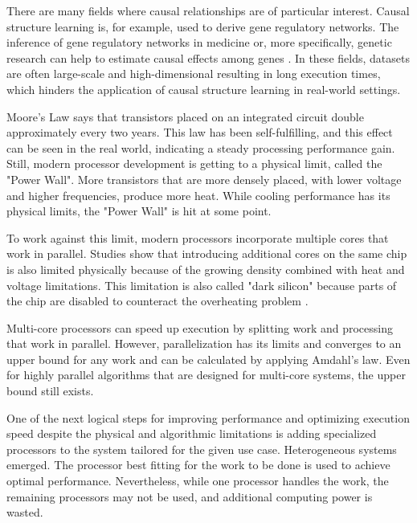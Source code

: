 There are many fields where causal relationships are of particular interest. Causal structure learning is, for example, used to derive gene regulatory networks. The inference of gene regulatory networks in medicine or, more specifically, genetic research can help to estimate causal effects among genes \cite{rauJointEstimationCausal2013}.
In these fields, datasets are often large-scale and high-dimensional resulting in long execution times, which hinders the application of causal structure learning in real-world settings.

Moore's Law \cite{mooreCrammingMoreComponents2006} says that transistors placed on an integrated circuit double approximately every two years. This law has been self-fulfilling, and this effect can be seen in the real world, indicating a steady processing performance gain. Still, modern processor development is getting to a physical limit, called the "Power Wall". More transistors that are more densely placed, with lower voltage and higher frequencies, produce more heat. While cooling performance has its physical limits, the "Power Wall" is hit at some point.

To work against this limit, modern processors incorporate multiple cores that work in parallel. Studies show that introducing additional cores on the same chip is also limited physically because of the growing density combined with heat and voltage limitations. This limitation is also called "dark silicon" because parts of the chip are disabled to counteract the overheating problem \cite{esmaeilzadehDarkSiliconEnd2011}.

Multi-core processors can speed up execution by splitting work and processing that work in parallel. However, parallelization has its limits and converges to an upper bound for any work and can be calculated by applying Amdahl's law\cite{amdahlValiditySingleProcessor1967}. Even for highly parallel algorithms that are designed for multi-core systems, the upper bound still exists.

One of the next logical steps for improving performance and optimizing execution speed despite the physical and algorithmic limitations is adding specialized processors to the system tailored for the given use case. Heterogeneous systems emerged. The processor best fitting for the work to be done is used to achieve optimal performance. Nevertheless, while one processor handles the work, the remaining processors may not be used, and additional computing power is wasted.


